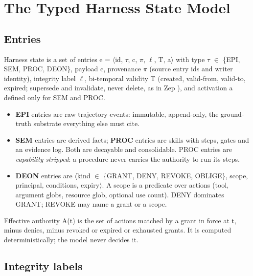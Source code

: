 \section{The Typed Harness State Model}
\label{sec:the-typed-harness-state-mode}

\subsection{Entries}

Harness state is a set of entries e = $\langle$id, $\tau$, c, $\pi$, $\ell$, T, a$\rangle$ with type $\tau$ $\in$ \{EPI, SEM, PROC, DEON\}, payload c, provenance $\pi$ (source entry ids and writer identity), integrity label $\ell$, bi-temporal validity T (created, valid-from, valid-to, expired; supersede and invalidate, never delete, as in Zep \citep{rasmussen2025}), and activation a defined only for SEM and PROC.

\begin{itemize}
\item \textbf{EPI} entries are raw trajectory events: immutable, append-only, the ground-truth substrate everything else must cite.
\item \textbf{SEM} entries are derived facts; \textbf{PROC} entries are skills with steps, gates and an evidence log. Both are decayable and consolidable. PROC entries are \emph{capability-stripped}: a procedure never carries the authority to run its steps.
\item \textbf{DEON} entries are $\langle$kind $\in$ \{GRANT, DENY, REVOKE, OBLIGE\}, scope, principal, conditions, expiry$\rangle$. A scope is a predicate over actions (tool, argument globs, resource glob, optional use count). DENY dominates GRANT; REVOKE may name a grant or a scope.
\end{itemize}

Effective authority A(t) is the set of actions matched by a grant in force at t, minus denies, minus revoked or expired or exhausted grants. It is computed deterministically; the model never decides it.

\subsection{Integrity labels}

